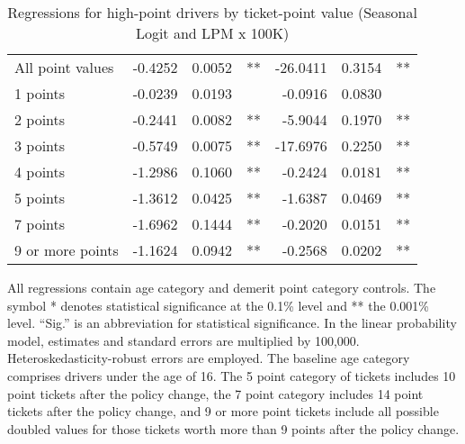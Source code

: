 \begin{table}
\begin{tabular}{l r r l r r l}
All point values                &  -0.4252        &  0.0052       &   **       &  -26.0411        &  0.3154       &   **       \\ 
1 points                        &  -0.0239        &  0.0193       &            &  -0.0916        &  0.0830       &            \\ 
2 points                        &  -0.2441        &  0.0082       &   **       &  -5.9044        &  0.1970       &   **       \\ 
3 points                        &  -0.5749        &  0.0075       &   **       &  -17.6976        &  0.2250       &   **       \\ 
4 points                        &  -1.2986        &  0.1060       &   **       &  -0.2424        &  0.0181       &   **       \\ 
5 points                        &  -1.3612        &  0.0425       &   **       &  -1.6387        &  0.0469       &   **       \\ 
7 points                        &  -1.6962        &  0.1444       &   **       &  -0.2020        &  0.0151       &   **       \\ 
9 or more points                &  -1.1624        &  0.0942       &   **       &  -0.2568        &  0.0202       &   **       \\ 

\hline 

\end{tabular} 
\caption{Regressions for high-point drivers by ticket-point value (Seasonal Logit and LPM x 100K)} 
All regressions contain age category and demerit point category controls. 
The symbol * denotes statistical significance at the 0.1\% level 
and ** the 0.001\% level. 
``Sig.'' is an abbreviation for statistical significance. 
In the linear probability model, estimates and standard errors are multiplied by 100,000. 
Heteroskedasticity-robust errors are employed. 
The baseline age category comprises drivers under the age of 16. 
The 5 point category of tickets includes 10 point tickets after the policy change,  
the 7 point category includes 14 point tickets after the policy change,  
and 9 or more point tickets include all possible doubled values for those tickets  
worth more than 9 points after the policy change. 
\label{tab:seas_Logit_vs_LPMx100K_regs_by_points} 
\end{table} 
 
